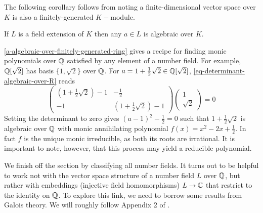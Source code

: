 The following corollary follows from noting a finite-dimensional vector space over $K$ is also a finitely-generated $K-$module. 

\begin{corollary}
If $L$ is a field extension of $K$ then any $a\in L$ is algebraic over $K$.
\end{corollary}

\begin{example}\label{recipe-for-finding-polys-over-q}
\cref{a-algebraic-over-finitely-generated-ring} gives a recipe for finding monic polynomials over $\mathbb{Q}$ satisfied by any element of a number field. For example,$\mathbb{Q}[\sqrt{2}]$ has basis $\{1,\sqrt{2}\}$ over $\mathbb{Q}$. For $a=1+\frac{1}{2}\sqrt{2}\in \mathbb{Q}[\sqrt{2}]$, \cref{eq-determinant-algebraic-over-R} reads
$$\begin{pmatrix}
(1+\frac{1}{2}\sqrt{2}) - 1 & -\frac{1}{2}\\
-1 & (1+\frac{1}{2}\sqrt{2}) - 1
\end{pmatrix}\begin{pmatrix}1\\\sqrt{2}\end{pmatrix}=0$$
Setting the determinant to zero gives $(a-1)^2-\frac{1}{2}=0$ such that $1+\frac{1}{2}\sqrt{2}$ is algebraic over $\mathbb{Q}$ with monic annihilating polynomial $f(x)=x^2-2x+\frac{1}{2}$. In fact $f$ is the unique monic irreducible, as both its roots are irrational. It is important to note, however, that this process may yield a reducible polynomial.
\end{example}

We finish off the section by classifying all number fields. It turns out to be helpful to work not with the vector space structure of a number field $L$ over $\mathbb{Q}$, but rather with embeddings (injective field homomorphisms) $L\rightarrow \mathbb{C}$ that restrict to the identity on $\mathbb{Q}$. To explore this link, we need to borrow some results from Galois theory. We will roughly follow Appendix 2 of \cite{NumberFields}. 



